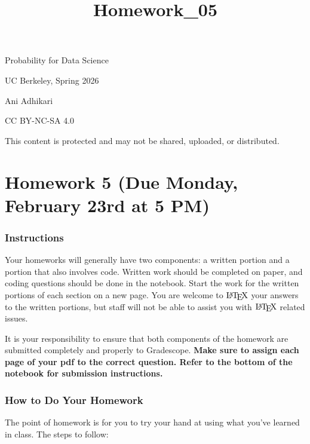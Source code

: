 \documentclass[11pt]{article}
\title{Homework\_05}
\let\Oldlatex\LaTeX
\renewcommand{\LaTeX}{\textrm{\Oldlatex}}
\begin{document}
    
    \maketitle
    
    

    
    Probability for Data Science

UC Berkeley, Spring 2026

Ani Adhikari

CC BY-NC-SA 4.0

This content is protected and may not be shared, uploaded, or
distributed.

    \section{Homework 5 (Due Monday, February 23rd at 5
PM)}\label{homework-5-due-monday-february-23rd-at-5-pm}

    \subsubsection{Instructions}\label{instructions}

Your homeworks will generally have two components: a written portion and
a portion that also involves code. Written work should be completed on
paper, and coding questions should be done in the notebook. Start the
work for the written portions of each section on a new page. You are
welcome to \(\LaTeX\) your answers to the written portions, but staff
will not be able to assist you with \(\LaTeX\) related issues.

It is your responsibility to ensure that both components of the homework
are submitted completely and properly to Gradescope. \textbf{Make sure
to assign each page of your pdf to the correct question. Refer to the
bottom of the notebook for submission instructions.}

    \subsubsection{How to Do Your Homework}\label{how-to-do-your-homework}

The point of homework is for you to try your hand at using what you've
learned in class. The steps to follow:
\end{document}
